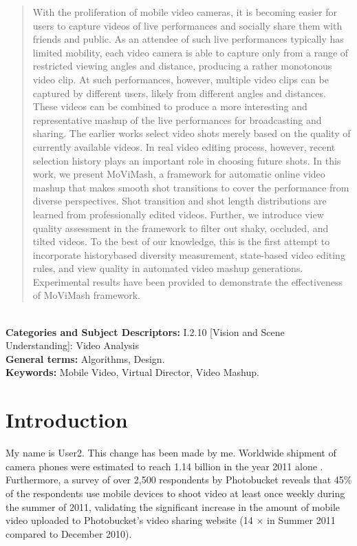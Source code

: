 \documentclass{sig-alternate}
\begin{document}
\maketitle
\begin{abstract}
With the proliferation of mobile video cameras, it is becoming easier
for users to capture videos of live performances and socially
share them with friends and public. As an attendee of such live
performances typically has limited mobility, each video camera is
able to capture only from a range of restricted viewing angles and
distance, producing a rather monotonous video clip. At such performances,
however, multiple video clips can be captured by different
users, likely from different angles and distances. These videos
can be combined to produce a more interesting and representative
mashup of the live performances for broadcasting and sharing. The
earlier works select video shots merely based on the quality of currently
available videos. In real video editing process, however, recent
selection history plays an important role in choosing future
shots. In this work, we present MoViMash, a framework for automatic
online video mashup that makes smooth shot transitions to
cover the performance from diverse perspectives. Shot transition
and shot length distributions are learned from professionally edited
videos. Further, we introduce view quality assessment in the framework
to filter out shaky, occluded, and tilted videos. To the best
of our knowledge, this is the first attempt to incorporate historybased
diversity measurement, state-based video editing rules, and
view quality in automated video mashup generations. Experimental
results have been provided to demonstrate the effectiveness of
MoViMash framework.
\end{abstract}\\
\textbf{Categories and Subject Descriptors:} I.2.10 [Vision and Scene Understanding]: Video Analysis\\
\textbf{General terms:} Algorithms, Design.\\
\textbf{Keywords:} Mobile Video, Virtual Director, Video Mashup.


\section{Introduction}\label{intro}
My name is User2. This change has been made by me. 
Worldwide shipment of camera phones were estimated to reach
1.14 billion in the year 2011 alone \cite{1}. Furthermore, a survey of over 2,500 respondents by Photobucket reveals that 45\% of the respondents use mobile devices to shoot video at least once weekly during the summer of 2011, validating the significant increase in
the amount of mobile video uploaded to Photobucket's video sharing
website (14 $\times$ in Summer 2011 compared to December 2010)\cite{2}.
\end{document}
